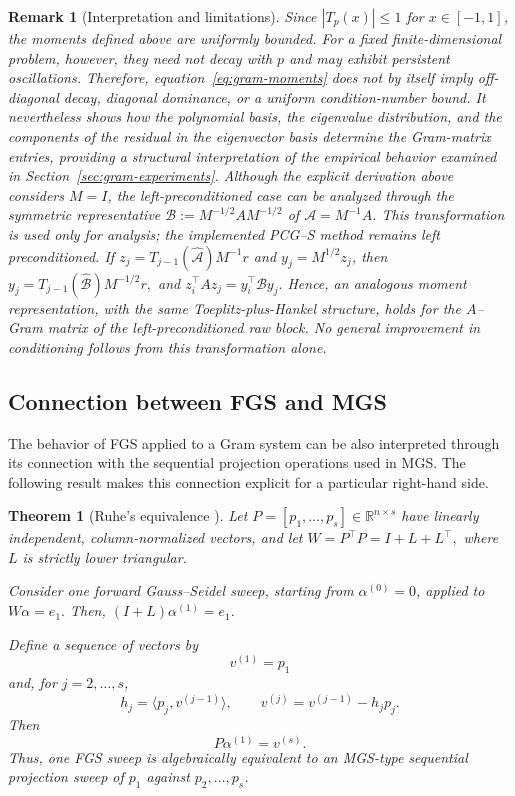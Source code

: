 \documentclass[pdflatex,sn-mathphys-num]{sn-jnl}%
\newtheorem{theorem}{Theorem}
\newtheorem{remark}{Remark}
\begin{document}
\begin{remark}[Interpretation and limitations]
\label{remark:moment-decay}
Since $|T_p(x)|\leq1$ for $x\in[-1,1]$, the moments defined above are
uniformly bounded. For a fixed finite-dimensional problem, however,
they need not decay with $p$ and may exhibit persistent oscillations.
Therefore, equation~\eqref{eq:gram-moments} does not by itself imply
off-diagonal decay, diagonal dominance, or a uniform condition-number
bound. It nevertheless shows how the polynomial basis, the
eigenvalue distribution, and the components of the residual in the
eigenvector basis determine the Gram-matrix entries, providing a
structural interpretation of the empirical behavior examined in
Section~\ref{sec:gram-experiments}.
Although the explicit derivation above considers $M=I$, the
left-preconditioned case can be analyzed through the symmetric
representative $
\mathcal{B}:=M^{-1/2}AM^{-1/2}$
of $\mathcal{A}=M^{-1}A$. This transformation is used only for
analysis; the implemented PCG--S method remains left preconditioned.
If $z_j=T_{j-1}(\widehat{\mathcal A})M^{-1}r$ and
$y_j=M^{1/2}z_j$, then $y_j=T_{j-1}(\widehat{\mathcal B})M^{-1/2}r,$ and
$z_i^\top A z_j=y_i^\top\mathcal B y_j.$
Hence, an analogous moment representation, with the same
Toeplitz-plus-Hankel structure, holds for the $A$--Gram matrix of the
left-preconditioned raw block. No general improvement in conditioning
follows from this transformation alone.
\end{remark}


\subsection{Connection between FGS and MGS}
\label{sec:gs-mgs}

The behavior of FGS applied to a Gram system can be also interpreted
through its connection with the sequential projection operations
used in MGS. The following result makes this
connection explicit for a particular right-hand side.

\begin{theorem}[Ruhe’s equivalence {\cite{Ruhe83}}]
\label{thm:ruhe}
Let $P=[p_1,\dots,p_s]\in\mathbb{R}^{n\times s}$
have linearly independent, column-normalized vectors, and let $
W=P^\top P=I+L+L^\top,$
where $L$ is strictly lower triangular.

Consider one forward Gauss--Seidel sweep, starting from
$\alpha^{(0)}=0$, applied to
$W\alpha=e_1.$
Then, $
(I+L)\alpha^{(1)}=e_1.$

Define a sequence of vectors by
\[
v^{(1)}=p_1
\]
and, for $j=2,\dots,s$,
\[
h_j=\langle p_j,v^{(j-1)}\rangle,
\qquad
v^{(j)}=v^{(j-1)}-h_jp_j.
\]
Then
\[
P\alpha^{(1)}=v^{(s)}.
\]
Thus, one FGS sweep is algebraically equivalent to an MGS-type sequential projection sweep of $p_1$ against
$p_2,\dots,p_s$.
\end{theorem}
\end{document}
